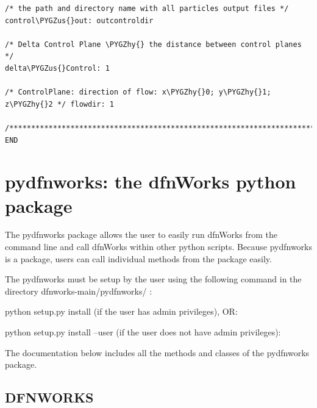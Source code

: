 \documentclass[letterpaper,10pt,english]{sphinxmanual}
\def\PYGZus{\char`\_}
\def\PYGZhy{\char`\-}
\begin{document}
\begin{Verbatim}[commandchars=\\\{\}]
/* the path and directory name with all particles output files */
control\PYGZus{}out: outcontroldir

/* Delta Control Plane \PYGZhy{} the distance between control planes */
delta\PYGZus{}Control: 1

/* ControlPlane: direction of flow: x\PYGZhy{}0; y\PYGZhy{}1; z\PYGZhy{}2 */ flowdir: 1

/**************************************************************************/
END
\end{Verbatim}


\chapter{pydfnworks: the dfnWorks python package}
\label{pydfnworks:dfnworks-python-chapter}\label{pydfnworks::doc}\label{pydfnworks:pydfnworks-the-dfnworks-python-package}
The pydfnworks package allows the user to easily run dfnWorks from the command line and  call dfnWorks within other python scripts. Because pydfnworks is a package, users can call individual methods from the package easily.

The pydfnworks must be setup by the user using the following command in the directory dfnworks-main/pydfnworks/ :

python setup.py install (if the user has admin privileges), OR:

python setup.py install --user (if the user does not have admin privileges):

The documentation below includes all the methods and classes of the pydfnworks package.


\section{DFNWORKS}
\label{pydfnworks:dfnworks}
\end{document}
